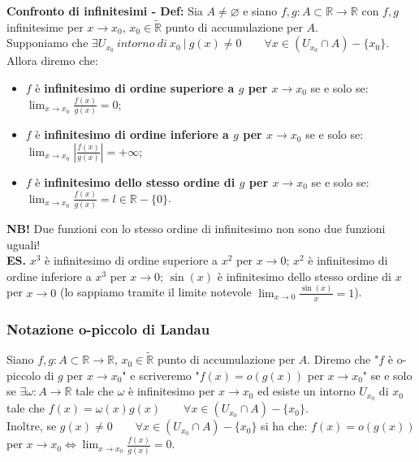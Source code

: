 \documentclass{article}
\begin{document}
\noindent\textbf{Confronto di infinitesimi - Def:} Sia $A \neq \varnothing$ e siano $f, g: A \subset \mathbb{R} \xrightarrow{} \mathbb{R}$ con $f, g$ infinitesime per $x \to x_0$, $x_0 \in \widetilde{\mathbb{R}}$ punto di accumulazione per $A$.\\
Supponiamo che $\exists U_{x_0} \ intorno \ di \ x_0 \ | \ g(x) \neq 0 \qquad \forall x \in (U_{x_0} \cap A) - \{x_0\}$. Allora diremo che:
\begin{itemize}
    \item $f$ è \textbf{infinitesimo di ordine superiore a $g$ per $x \to x_0$} se e solo se: $\lim_{x \to x_0} \frac{f(x)}{g(x)} = 0$;
    \item $f$ è \textbf{infinitesimo di ordine inferiore a $g$ per $x \to x_0$} se e solo se: $\lim_{x \to x_0} \left|\frac{f(x)}{g(x)}\right| = +\infty$;
    \item $f$ è \textbf{infinitesimo dello stesso ordine di $g$ per $x \to x_0$} se e solo se: $\lim_{x \to x_0} \frac{f(x)}{g(x)} = l \in \mathbb{R} - \{0\}$.
\end{itemize}

\noindent\textbf{NB!} Due funzioni con lo stesso ordine di infinitesimo non sono due funzioni uguali!\\

\noindent\textbf{ES.} $x^3$ è infinitesimo di ordine superiore a $x^2$ per $x \to 0$; $x^2$ è infinitesimo di ordine inferiore a $x^3$ per $x \to 0$; $\sin(x)$ è infinitesimo dello stesso ordine di $x$ per $x \to 0$ (lo sappiamo tramite il limite notevole $\lim_{x \to 0} \frac{\sin(x)}{x} = 1$).

\subsubsection{Notazione o-piccolo di Landau}
Siano $f, g: A \subset \mathbb{R} \xrightarrow{} \mathbb{R}$, $x_0 \in \widetilde{\mathbb{R}}$ punto di accumulazione per $A$. Diremo che "$f$ è o-piccolo di $g$ per $x \to x_0$" e scriveremo "$f(x) = o(g(x))$ per $x \to x_0$" se e solo se $\exists \omega: A \xrightarrow{} \mathbb{R}$ tale che $\omega$ è infinitesimo per $x \to x_0$ ed esiste un intorno $U_{x_0}$ di $x_0$ tale che $f(x) = \omega(x)g(x) \qquad \forall x \in (U_{x_0} \cap A) - \{x_0\}$.\\
Inoltre, se $g(x) \neq 0 \qquad \forall x \in (U_{x_0} \cap A) - \{x_0\}$ si ha che: $f(x) = o(g(x))$ per $x \to x_0 \iff \lim_{x \to x_0} \frac{f(x)}{g(x)} = 0$.\\
\end{document}
